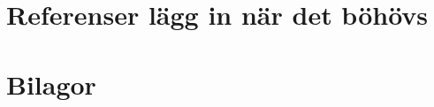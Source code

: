 \documentclass{article}
\begin{document}
\section{Referenser lägg in när det böhövs}


\section{Bilagor}
\end{document}
